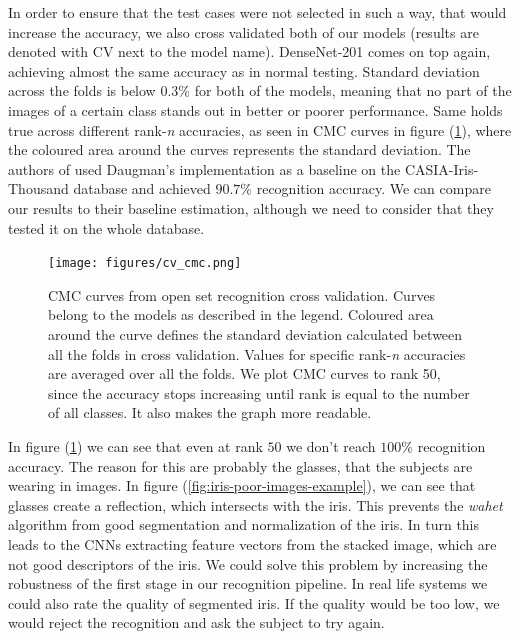 \documentclass[9pt]{IEEEtran}
\begin{document}
In order to ensure that the test cases were not selected in such a way, that would increase the accuracy, we also cross validated both of our models (results are denoted with CV next to the model name). DenseNet-201 comes on top again, achieving almost the same accuracy as in normal testing. Standard deviation across the folds is below $0.3\%$ for both of the models, meaning that no part of the images of a certain class stands out in better or poorer performance. Same holds true across different rank-\textit{n} accuracies, as seen in CMC curves in figure (\ref{fig:open-set-cv-cmc}), where the coloured area around the curves represents the standard deviation. The authors of \cite{nguyen2017iris} used Daugman's implementation as a baseline on the CASIA-Iris-Thousand database and achieved $90.7\%$ recognition accuracy. We can compare our results to their baseline estimation, although we need to consider that they tested it on the whole database.

\begin{figure}[h]
    \centering
    \texttt{[image: figures/cv\_cmc.png]}
    \caption{CMC curves from open set recognition cross validation. Curves belong to the models as described in the legend. Coloured area around the curve defines the standard deviation calculated between all the folds in cross validation. Values for specific rank-\textit{n} accuracies are averaged over all the folds. We plot CMC curves to rank 50, since the accuracy stops increasing until rank is equal to the number of all classes. It also makes the graph more readable.}
    \label{fig:open-set-cv-cmc}
\end{figure}

In figure (\ref{fig:open-set-cv-cmc}) we can see that even at rank $50$ we don't reach $100\%$ recognition accuracy. The reason for this are probably the glasses, that the subjects are wearing in images. In figure (\ref{fig:iris-poor-images-example}), we can see that glasses create a reflection, which intersects with the iris. This prevents the \textit{wahet} algorithm from good segmentation and normalization of the iris. In turn this leads to the CNNs extracting feature vectors from the stacked image, which are not good descriptors of the iris. We could solve this problem by increasing the robustness of the first stage in our recognition pipeline. In real life systems we could also rate the quality of segmented iris. If the quality would be too low, we would reject the recognition and ask the subject to try again.
\end{document}

